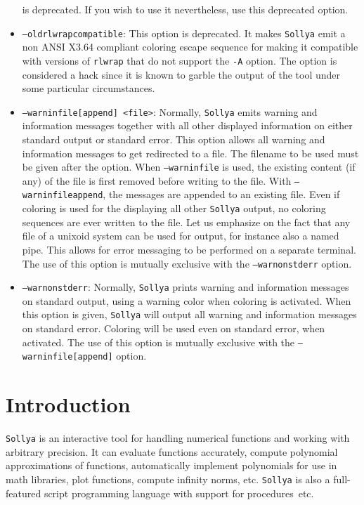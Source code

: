 \documentclass[a4paper]{article}
\newcommand{\sollya}{\texttt{Sollya}\xspace}
\begin{document}
\begin{itemize}
  is deprecated. If you wish to use it nevertheless, use this
  deprecated option.
\item \texttt{--oldrlwrapcompatible}: This option is deprecated. It
  makes \sollya emit a non ANSI X3.64 compliant coloring escape
  sequence for making it compatible with versions of \texttt{rlwrap}
  that do not support the \texttt{-A} option. The option is considered
  a hack since it is known to garble the output of the tool under
  some particular circumstances.
\item \texttt{--warninfile[append] <file>}: Normally, \sollya emits
  warning and information messages together with all other displayed
  information on either standard output or standard error. This option
  allows all warning and information messages to get redirected to a
  file. The filename to be used must be given after the option.  When
  \texttt{--warninfile} is used, the existing content (if any) of the
  file is first removed before writing to the file. With
  \texttt{--warninfileappend}, the messages are appended to an
  existing file. Even if coloring is used for the displaying all other
  \sollya output, no coloring sequences are ever written to the
  file. Let us emphasize on the fact that any file of a unixoid system
  can be used for output, for instance also a named pipe. This allows
  for error messaging to be performed on a separate terminal. The use
  of this option is mutually exclusive with the
  \texttt{--warnonstderr} option.
\item \texttt{--warnonstderr}: Normally, \sollya prints warning and
  information messages on standard output, using a warning color 
  when coloring is activated. When this option is given, \sollya will 
  output all warning and information messages on standard error. Coloring
  will be used even on standard error, when activated. The use of 
  this option is mutually exclusive with the \texttt{--warninfile[append]} 
  option.
\end{itemize}


\section{Introduction}
\label{sec:introduction}
\sollya is an interactive tool for handling numerical functions and working with arbitrary precision. It can evaluate functions accurately, compute polynomial approximations of functions, automatically implement polynomials for use in math libraries, plot functions, compute infinity norms, etc. \sollya is also a full-featured script programming language with support for procedures~etc.
\end{document}
